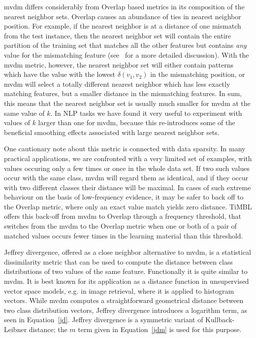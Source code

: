 \documentclass{report}
\begin{document}
{\sc mvdm} differs considerably from Overlap based metrics in its
composition of the nearest neighbor sets. Overlap causes an abundance
of ties in nearest neighbor position. For example, if the nearest
neighbor is at a distance of one mismatch from the test instance, then
the nearest neighbor set will contain the entire partition of the
training set that matches all the other features but contains {\em
any} value for the mismatching feature (see~ for a
more detailed discussion). With the {\sc mvdm} metric, however, the
nearest neighbor set will either contain patterns which have the value
with the lowest $\delta(v_{1}, v_{2})$ in the mismatching position, or
{\sc mvdm} will select a totally different nearest neighbor which has
less exactly matching features, but a smaller distance in the
mismatching features. In sum, this means that the nearest neighbor set
is usually much smaller for {\sc mvdm} at the same value of $k$. In
NLP tasks we have found it very useful to experiment with values of
$k$ larger than one for {\sc mvdm}, because this re-introduces some of
the beneficial smoothing effects associated with large nearest
neighbor sets.

One cautionary note about this metric is connected with data
sparsity. In many practical applications, we are confronted with a
very limited set of examples, with values occuring only a few times or
once in the whole data set. If two such values occur with the same
class, {\sc mvdm} will regard them as identical, and if they occur
with two different classes their distance will be maximal. In cases of
such extreme behaviour on the basis of low-frequency evidence, it may
be safer to back off to the Overlap metric, where only an exact value
match yields zero distance. TiMBL offers this back-off from {\sc mvdm}
to Overlap through a frequency threshold, that switches from the {\sc
mvdm} to the Overlap metric when one or both of a pair of matched
values occurs fewer times in the learning material than this
threshold.

Jeffrey divergence, offered as a close neighbor alternative to {\sc
  mvdm}, is a statistical dissimilarity metric that can be used to
compute the distance between class distributions of two values of the
same feature. Functionally it is quite similar to {\sc mvdm}. It is
best known for its application as a distance function in unsupervised
vector space models, e.g. in image retrieval, where it is applied to
histogram vectors. While {\sc mvdm} computes a straightforward
geometrical distance between two class distribution vectors, Jeffrey
divergence introduces a logarithm term, as seen in
Equation~\ref{jd}. Jeffrey divergence is a symmetric variant of
Kullback-Leibner distance; the $m$ term given in Equation~\ref{jdm} is
used for this purpose.
\end{document}
